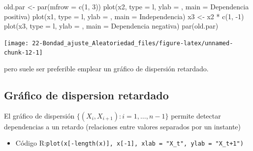 \documentclass[
]{book}
\newenvironment{Shaded}{\begin{snugshade}}{\end{snugshade}}
\newcommand{\AttributeTok}[1]{\textcolor[rgb]{0.77,0.63,0.00}{#1}}
\newcommand{\DecValTok}[1]{\textcolor[rgb]{0.00,0.00,0.81}{#1}}
\newcommand{\FunctionTok}[1]{\textcolor[rgb]{0.00,0.00,0.00}{#1}}
\newcommand{\NormalTok}[1]{#1}
\newcommand{\OtherTok}[1]{\textcolor[rgb]{0.56,0.35,0.01}{#1}}
\newcommand{\SpecialCharTok}[1]{\textcolor[rgb]{0.00,0.00,0.00}{#1}}
\newcommand{\StringTok}[1]{\textcolor[rgb]{0.31,0.60,0.02}{#1}}
\providecommand{\tightlist}{%
  \setlength{\itemsep}{0pt}\setlength{\parskip}{0pt}}
\theoremstyle{break}
\theoremstyle{nonumberplain}
\begin{document}
\begin{Shaded}
\begin{Highlighting}[]
\NormalTok{old.par }\OtherTok{\textless{}{-}} \FunctionTok{par}\NormalTok{(}\AttributeTok{mfrow =} \FunctionTok{c}\NormalTok{(}\DecValTok{1}\NormalTok{, }\DecValTok{3}\NormalTok{))}
\FunctionTok{plot}\NormalTok{(x2, }\AttributeTok{type =} \StringTok{\textquotesingle{}l\textquotesingle{}}\NormalTok{, }\AttributeTok{ylab =} \StringTok{\textquotesingle{}\textquotesingle{}}\NormalTok{, }\AttributeTok{main =} \StringTok{\textquotesingle{}Dependencia positiva\textquotesingle{}}\NormalTok{)}
\FunctionTok{plot}\NormalTok{(x1, }\AttributeTok{type =} \StringTok{\textquotesingle{}l\textquotesingle{}}\NormalTok{, }\AttributeTok{ylab =} \StringTok{\textquotesingle{}\textquotesingle{}}\NormalTok{, }\AttributeTok{main =} \StringTok{\textquotesingle{}Independencia\textquotesingle{}}\NormalTok{)}
\NormalTok{x3 }\OtherTok{\textless{}{-}}\NormalTok{ x2 }\SpecialCharTok{*} \FunctionTok{c}\NormalTok{(}\DecValTok{1}\NormalTok{, }\SpecialCharTok{{-}}\DecValTok{1}\NormalTok{)}
\FunctionTok{plot}\NormalTok{(x3, }\AttributeTok{type =} \StringTok{\textquotesingle{}l\textquotesingle{}}\NormalTok{, }\AttributeTok{ylab =} \StringTok{\textquotesingle{}\textquotesingle{}}\NormalTok{, }\AttributeTok{main =} \StringTok{\textquotesingle{}Dependencia negativa\textquotesingle{}}\NormalTok{)}
\FunctionTok{par}\NormalTok{(old.par)}
\end{Highlighting}
\end{Shaded}

\begin{center}\texttt{[image: 22-Bondad\_ajuste\_Aleatoriedad\_files/figure-latex/unnamed-chunk-12-1]} \end{center}

pero suele ser preferible emplear un gráfico de dispersión retardado.

\hypertarget{gruxe1fico-de-dispersion-retardado}{%
\subsection{Gráfico de dispersion retardado}\label{gruxe1fico-de-dispersion-retardado}}

El gráfico de dispersión \(\{(X_{i},X_{i+1}) : i = 1, \ldots, n-1 \}\) permite
detectar dependencias a un retardo (relaciones entre valores separados
por un instante)

\begin{itemize}
\tightlist
\item
  Código R:\texttt{plot(x{[}-length(x){]},\ x{[}-1{]},\ xlab\ =\ "X\_t",\ ylab\ =\ "X\_t+1")}
\end{itemize}
\end{document}
